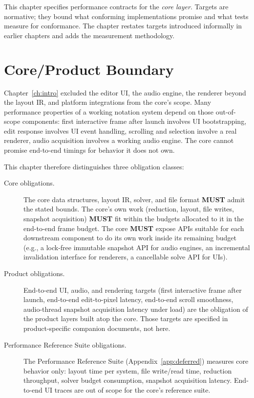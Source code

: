 \documentclass[11pt,letterpaper]{report}
\newcommand{\MUST}{\textbf{MUST}}
\begin{document}
This chapter specifies performance contracts for the \emph{core
layer}. Targets are normative; they bound what conforming
implementations promise and what tests measure for conformance.
The chapter restates targets introduced informally in earlier
chapters and adds the measurement methodology.

\section{Core/Product Boundary}
\label{sec:perf:boundary}

Chapter~\ref{ch:intro} excluded the editor UI, the audio engine,
the renderer beyond the layout IR, and platform integrations from
the core's scope. Many performance properties of a working
notation system depend on those out-of-scope components: first
interactive frame after launch involves UI bootstrapping, edit
response involves UI event handling, scrolling and selection
involve a real renderer, audio acquisition involves a working
audio engine. The core cannot promise end-to-end timings for
behavior it does not own.

This chapter therefore distinguishes three obligation classes:

\begin{description}
  \item[Core obligations.] The core data structures, layout IR,
    solver, and file format \MUST{} admit the stated bounds. The
    core's own work (reduction, layout, file writes, snapshot
    acquisition) \MUST{} fit within the budgets allocated to it
    in the end-to-end frame budget. The core \MUST{} expose APIs
    suitable for each downstream component to do its own work
    inside its remaining budget (e.g., a lock-free immutable
    snapshot API for audio engines, an incremental invalidation
    interface for renderers, a cancellable solve API for UIs).
  \item[Product obligations.] End-to-end UI, audio, and rendering
    targets (first interactive frame after launch, end-to-end
    edit-to-pixel latency, end-to-end scroll smoothness,
    audio-thread snapshot acquisition latency under load) are the
    obligation of the product layers built atop the core. Those
    targets are specified in product-specific companion documents,
    not here.
  \item[Performance Reference Suite obligations.] The Performance
    Reference Suite (Appendix~\ref{app:deferred}) measures core
    behavior only: layout time per system, file write/read time,
    reduction throughput, solver budget consumption, snapshot
    acquisition latency. End-to-end UI traces are out of scope
    for the core's reference suite.
\end{description}
\end{document}
